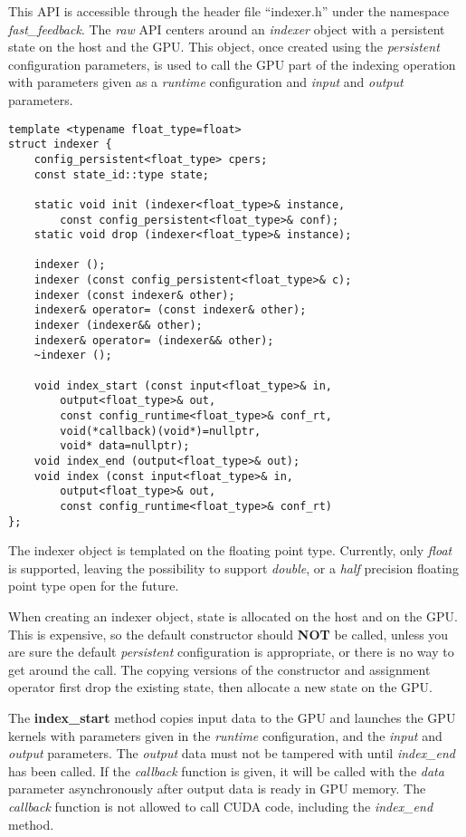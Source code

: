 \documentclass[a4paper,10pt]{article}
\begin{document}
This API is accessible through the header file ``indexer.h'' under the namespace \emph{fast\_feed\-back}. The \emph{raw} API centers around an \emph{indexer} object with a persistent state on the host and the GPU. This object, once created using the \emph{persistent} configuration parameters, is used to call the GPU part of the indexing operation with parameters given as a \emph{runtime} configuration and \emph{input} and \emph{output} parameters.
%
\begin{lstlisting}
template <typename float_type=float>
struct indexer {
    config_persistent<float_type> cpers;
    const state_id::type state;

    static void init (indexer<float_type>& instance,
        const config_persistent<float_type>& conf);
    static void drop (indexer<float_type>& instance);

    indexer ();
    indexer (const config_persistent<float_type>& c);
    indexer (const indexer& other);
    indexer& operator= (const indexer& other);
    indexer (indexer&& other);
    indexer& operator= (indexer&& other);
    ~indexer ();

    void index_start (const input<float_type>& in,
        output<float_type>& out,
        const config_runtime<float_type>& conf_rt,
        void(*callback)(void*)=nullptr,
        void* data=nullptr);
    void index_end (output<float_type>& out);
    void index (const input<float_type>& in,
        output<float_type>& out,
        const config_runtime<float_type>& conf_rt)
};
\end{lstlisting}
%
The indexer object is templated on the floating point type. Currently, only \emph{float} is supported, leaving the possibility to support \emph{double}, or a \emph{half} precision floating point type open for the future.

When creating an indexer object, state is allocated on the host and on the GPU. This is expensive, so the default constructor should \textbf{NOT} be called, unless you are sure the default \emph{persistent} configuration is appropriate, or there is no way to get around the call. The copying versions of the constructor and assignment operator first drop the existing state, then allocate a new state on the GPU.

The \textbf{index\_start} method copies input data to the GPU and launches the GPU kernels with parameters given in the \emph{runtime} configuration, and the \emph{input} and \emph{output} parameters. The \emph{output} data must not be tampered with until \emph{index\_end} has been called. If the \emph{callback} function is given, it will be called with the \emph{data} parameter asynchronously after output data is ready in GPU memory. The \emph{callback} function is not allowed to call CUDA code, including the \emph{index\_end} method.
\end{document}
